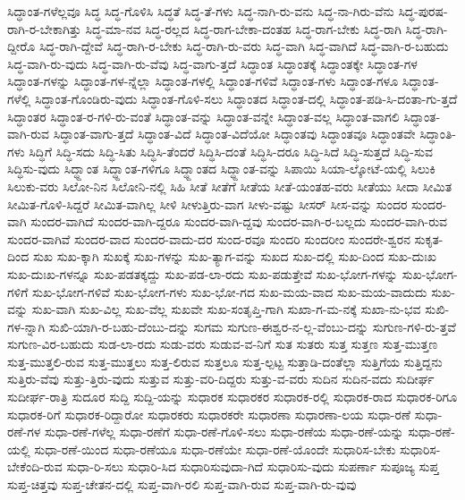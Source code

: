 {ಸಿದ್ಧಾಂತ-ಗಳೆಲ್ಲವೂ
ಸಿದ್ಧ
ಸಿದ್ಧ-ಗೊಳಿಸಿ
ಸಿದ್ಧತೆ
ಸಿದ್ಧ-ತೆ-ಗಳು
ಸಿದ್ಧ-ನಾಗಿ-ರು-ವನು
ಸಿದ್ಧ-ನಾ-ಗಿರು-ವೆನು
ಸಿದ್ಧ-ಪುರಷ-ರಾಗಿ-ರ-ಬೇಕಾಗಿತ್ತು
ಸಿದ್ಧ-ಮಾ-ನವ
ಸಿದ್ಧ-ರಲ್ಲದ
ಸಿದ್ಧ-ರಾಗ-ಬೇಕಾ-ದಂತಹ
ಸಿದ್ಧ-ರಾಗ-ಬೇಕು
ಸಿದ್ಧ-ರಾಗಿ
ಸಿದ್ಧ-ರಾಗಿ-ದ್ದೀರೊ
ಸಿದ್ಧ-ರಾಗಿ-ದ್ದೇವೆ
ಸಿದ್ಧ-ರಾಗಿ-ರ-ಬೇಕು
ಸಿದ್ಧ-ರಾಗಿ-ರು-ವರು
ಸಿದ್ಧ-ವಾಗಿ
ಸಿದ್ಧ-ವಾಗಿದೆ
ಸಿದ್ಧ-ವಾಗಿ-ರ-ಬಹುದು
ಸಿದ್ಧ-ವಾಗಿ-ರು-ವುದು
ಸಿದ್ಧ-ವಾಗಿ-ರು-ವೆವು
ಸಿದ್ಧ-ವಾಗು-ತ್ತದೆ
ಸಿದ್ಧಾಂತ
ಸಿದ್ಧಾಂತಕ್ಕೆ
ಸಿದ್ಧಾಂತಕ್ಕೇ
ಸಿದ್ಧಾಂತ-ಗಳ
ಸಿದ್ಧಾಂತ-ಗಳನ್ನು
ಸಿದ್ಧಾಂತ-ಗಳ-ನ್ನೆಲ್ಲಾ
ಸಿದ್ಧಾಂತ-ಗಳಲ್ಲಿ
ಸಿದ್ಧಾಂತ-ಗಳಿವೆ
ಸಿದ್ಧಾಂತ-ಗಳು
ಸಿದ್ಧಾಂತ-ಗಳೂ
ಸಿದ್ಧಾಂತ-ಗಳೆಲ್ಲಿ
ಸಿದ್ಧಾಂತ-ಗೊಂಡಿರು-ವುದು
ಸಿದ್ಧಾಂತ-ಗೊಳಿ-ಸಲು
ಸಿದ್ಧಾಂತದ
ಸಿದ್ಧಾಂತ-ದಲ್ಲಿ
ಸಿದ್ಧಾಂತ-ಪಡಿ-ಸಿ-ದಂತಾ-ಗು-ತ್ತದೆ
ಸಿದ್ಧಾಂತರ
ಸಿದ್ಧಾಂತ-ರ-ಗಳಿ-ರು-ವಂತೆ
ಸಿದ್ಧಾಂತ-ವನ್ನು
ಸಿದ್ಧಾಂತ-ವನ್ನೇ
ಸಿದ್ಧಾಂತ-ವಲ್ಲ
ಸಿದ್ಧಾಂತ-ವಾಗಲಿ
ಸಿದ್ಧಾಂತ-ವಾಗಿ-ರುವ
ಸಿದ್ಧಾಂತ-ವಾಗು-ತ್ತದೆ
ಸಿದ್ಧಾಂತ-ವಿದೆ
ಸಿದ್ಧಾಂತ-ವಿದೆಯೋ
ಸಿದ್ಧಾಂತವು
ಸಿದ್ಧಾಂತವೂ
ಸಿದ್ಧಾಂತವೇ
ಸಿದ್ಧಾಂತಿ-ಗಳು
ಸಿದ್ಧಿಗೆ
ಸಿದ್ಧಿ-ಸದು
ಸಿದ್ಧಿ-ಸಿತು
ಸಿದ್ಧಿಸಿ-ತೆಂದರೆ
ಸಿದ್ಧಿಸಿ-ದಂತೆ
ಸಿದ್ಧಿಸಿ-ದರೂ
ಸಿದ್ಧಿ-ಸಿದೆ
ಸಿದ್ಧಿ-ಸುತ್ತದೆ
ಸಿದ್ಧಿ-ಸುವ
ಸಿದ್ಧಿಸು-ವುದು
ಸಿದ್ಧ್ದಾಂತ
ಸಿದ್ಧ್ದಾಂತ-ಗಳಿಗೂ
ಸಿದ್ಧ್ದಾಂತದ
ಸಿದ್ಧ್ದಾಂತ-ವನ್ನು
ಸಿಪಾಯಿ
ಸಿಯಾ-ಲ್ಕೋಟೆ-ಯಲ್ಲಿ
ಸಿಲುಕಿ
ಸಿಲುಕು-ವರು
ಸಿಲೋ-ನಿನ
ಸಿಲೋನಿ-ನಲ್ಲಿ
ಸಿಹಿ
ಸೀತೆ
ಸೀತೆಗೆ
ಸೀತೆಯ
ಸೀತೆ-ಯಂತಹ-ವರು
ಸೀತೆಯು
ಸೀದಾ
ಸೀಮಿತ
ಸೀಮಿತ-ಗೊಳಿ-ಸಿದ್ದರೆ
ಸೀಮಿತ-ವಾಗಿಲ್ಲ
ಸೀಳಿ
ಸೀಳುತ್ತಿರು-ವಾಗ
ಸೀಳು-ವಷ್ಟು
ಸೀಸರ್
ಸೀಸ-ವನ್ನು
ಸುಂದರ
ಸುಂದರ-ವಾಗಿ
ಸುಂದರ-ವಾಗಿದೆ
ಸುಂದರ-ವಾಗಿ-ದ್ದರೂ
ಸುಂದರ-ವಾಗಿ-ದ್ದವು
ಸುಂದರ-ವಾಗಿ-ರ-ಬಲ್ಲದು
ಸುಂದರ-ವಾಗಿ-ರುವ
ಸುಂದರ-ವಾಗಿವೆ
ಸುಂದರ-ವಾದ
ಸುಂದರ-ವಾದು-ದರ
ಸುಂದ-ರವೂ
ಸುಂದರಿ
ಸುಂದರೀಂ
ಸುಂದರೇ-ಶ್ವರನ
ಸುಕೃತ-ದಿಂದ
ಸುಖ
ಸುಖ-ಕ್ಕಾಗಿ
ಸುಖಕ್ಕೆ
ಸುಖ-ಗಳನ್ನು
ಸುಖ-ತ್ಯಾಗ-ವನ್ನು
ಸುಖದ
ಸುಖ-ದಲ್ಲಿ
ಸುಖ-ದಿಂದ
ಸುಖ-ದುಃಖ
ಸುಖ-ದುಃಖ-ಗಳನ್ನೂ
ಸುಖ-ಪಡತಕ್ಕದ್ದು
ಸುಖ-ಪಡ-ಲಾ-ರದು
ಸುಖ-ಪಡುತ್ತೇವೆ
ಸುಖ-ಭೋಗ-ಗಳನ್ನು
ಸುಖ-ಭೋಗ-ಗಳಿಗೆ
ಸುಖ-ಭೋಗ-ಗಳಿವೆ
ಸುಖ-ಭೋಗ-ಗಳು
ಸುಖ-ಭೋ-ಗದ
ಸುಖ-ಮಯ-ವಾದ
ಸುಖ-ಮಯ-ವಾದುದು
ಸುಖ-ವನ್ನು
ಸುಖ-ವಾಗಿ
ಸುಖ-ವಿಲ್ಲ
ಸುಖ-ವೆಲ್ಲ
ಸುಖವೇ
ಸುಖ-ಸಂತೃಪ್ತಿ-ಗಾಗಿ
ಸುಖಾ-ಗ-ಮ-ನಕ್ಕೆ
ಸುಖಾ-ನು-ಭವ
ಸುಖಿ-ಗಳ-ನ್ನಾಗಿ
ಸುಖಿ-ಯಾಗಿ-ರ-ಬಹು-ದೆಂಬು-ದನ್ನು
ಸುಗಮ
ಸುಗುಣ-ಈಶ್ವರ-ನ-ಲ್ಲ-ವೆಂಬು-ದನ್ನು
ಸುಗುಣ-ಗಳಿ-ರು-ತ್ತವೆ
ಸುಗುಣ-ವಿರ-ಬಹುದು
ಸುಡ-ಲಾ-ರದು
ಸುಡು-ವರು
ಸುಡುವ-ವ-ನಿಗೆ
ಸುತ
ಸುತರು
ಸುತ್ತ
ಸುತ್ತಣ
ಸುತ್ತ-ಮುತ್ತಣ
ಸುತ್ತ-ಮುತ್ತಲಿ-ರುವ
ಸುತ್ತ-ಮುತ್ತಲು
ಸುತ್ತ-ಲಿರುವ
ಸುತ್ತಲೂ
ಸುತ್ತ-ಲ್ಪಟ್ಟ
ಸುತ್ತಾಡಿ-ದಂತೆಲ್ಲಾ
ಸುತ್ತಿಗೆಯ
ಸುತ್ತಿದ್ದನು
ಸುತ್ತಿರು-ವೆವು
ಸುತ್ತು-ತ್ತಿರು-ವುದು
ಸುತ್ತುವ
ಸುತ್ತು-ವರಿ-ದಿದ್ದರು
ಸುತ್ತು-ವ-ವರು
ಸುದಿನ
ಸುದಿನ-ವದು
ಸುದೀರ್ಘ
ಸುದೀರ್ಘ-ರಾತ್ರಿ
ಸುದೂರ
ಸುದ್ದಿ
ಸುದ್ದಿ-ಯನ್ನು
ಸುಧಾರಕ
ಸುಧಾರಕರ
ಸುಧಾರಕ-ರಲ್ಲಿ
ಸುಧಾರಕ-ರಾದ
ಸುಧಾರಕ-ರಿಗೂ
ಸುಧಾರಕ-ರಿಗೆ
ಸುಧಾರಕ-ರಿದ್ದಾರೋ
ಸುಧಾರಕರು
ಸುಧಾರಕರೇ
ಸುಧಾರಣಾ
ಸುಧಾರಣಾ-ಲಯ
ಸುಧಾ-ರಣೆ
ಸುಧಾ-ರಣೆ-ಗಳ
ಸುಧಾ-ರಣೆ-ಗಳೆಲ್ಲ
ಸುಧಾ-ರಣೆಗೆ
ಸುಧಾ-ರಣೆ-ಗೊಳಿ-ಸಲು
ಸುಧಾ-ರಣೆಯ
ಸುಧಾ-ರಣೆ-ಯನ್ನು
ಸುಧಾ-ರಣೆ-ಯಲ್ಲಿ
ಸುಧಾ-ರಣೆ-ಯಿಂದ
ಸುಧಾ-ರಣೆಯೂ
ಸುಧಾ-ರಣೆಯೇ
ಸುಧಾ-ರಣೆ-ಯೊಂದೇ
ಸುಧಾರಿಸ-ಬೇಕು
ಸುಧಾರಿಸ-ಬೇಕೆಂದಿ-ರುವ
ಸುಧಾ-ರಿ-ಸಲು
ಸುಧಾರಿ-ಸಿದ
ಸುಧಾರಿಸುವುದಾ-ಗಿದೆ
ಸುಧಾರಿಸು-ವುದು
ಸುಪರ್ಣಾ
ಸುಪೂಜ್ಯ
ಸುಪ್ತ
ಸುಪ್ತ-ಚಿತ್ತವು
ಸುಪ್ತ-ಚೇತನ-ದಲ್ಲಿ
ಸುಪ್ತ-ವಾಗಿ-ರಲಿ
ಸುಪ್ತ-ವಾಗಿ-ರುವ
ಸುಪ್ತ-ವಾಗಿ-ರು-ವುವು
}
